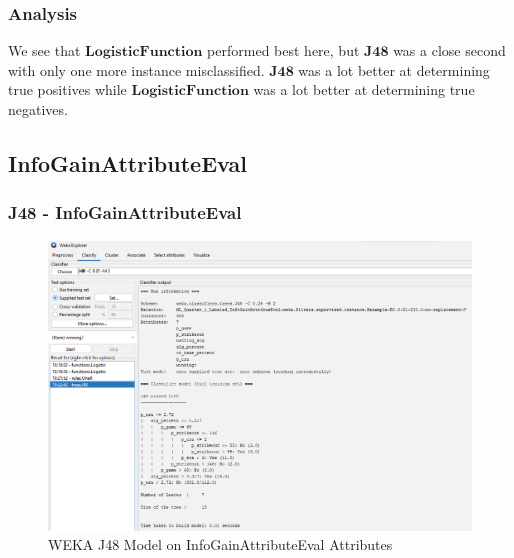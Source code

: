 \documentclass[12pt]{article}
\begin{document}
\newpage
\subsubsection{Analysis}
We see that $\textbf{LogisticFunction}$ performed best here, but $\textbf{J48}$ was a close second with only one more instance misclassified. $\textbf{J48}$ was a lot better at determining true positives while $\textbf{LogisticFunction}$ was a lot better at determining true negatives. 


\newpage
\subsection{InfoGainAttributeEval}

\subsubsection{J48 - InfoGainAttributeEval}
\begin{figure}[h!]
    \includegraphics[scale=0.4]{./images/InfoGainAttributeEval/J48-Model.png}
\centering
    \caption{WEKA J48 Model on InfoGainAttributeEval Attributes}
\end{figure}
\newpage
\end{document}
